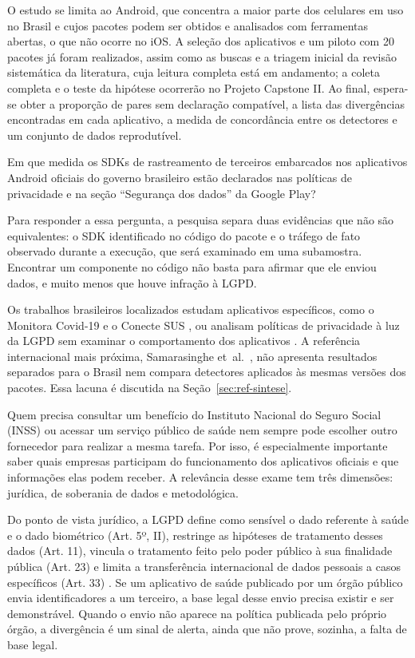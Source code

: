O estudo se limita ao Android, que concentra a maior parte dos celulares em uso no Brasil e cujos pacotes podem ser obtidos e analisados com ferramentas abertas, o que não ocorre no iOS. A seleção dos aplicativos e um piloto com 20 pacotes já foram realizados, assim como as buscas e a triagem inicial da revisão sistemática da literatura, cuja leitura completa está em andamento; a coleta completa e o teste da hipótese ocorrerão no Projeto Capstone II. Ao final, espera-se obter a proporção de pares sem declaração compatível, a lista das divergências encontradas em cada aplicativo, a medida de concordância entre os detectores e um conjunto de dados reprodutível.

\label{sec:problema}

Em que medida os SDKs de rastreamento de terceiros embarcados nos aplicativos Android oficiais do governo brasileiro estão declarados nas políticas de privacidade e na seção ``Segurança dos dados'' da Google Play?

Para responder a essa pergunta, a pesquisa separa duas evidências que não são equivalentes: o SDK identificado no código do pacote e o tráfego de fato observado durante a execução, que será examinado em uma subamostra. Encontrar um componente no código não basta para afirmar que ele enviou dados, e muito menos que houve infração à LGPD.

Os trabalhos brasileiros localizados estudam aplicativos específicos, como o Monitora Covid-19 \cite{lemos2022} e o Conecte SUS \cite{vaz2022}, ou analisam políticas de privacidade à luz da LGPD sem examinar o comportamento dos aplicativos \cite{reis2023}. A referência internacional mais próxima, Samarasinghe et~al.~\cite{samarasinghe2022}, não apresenta resultados separados para o Brasil nem compara detectores aplicados às mesmas versões dos pacotes. Essa lacuna é discutida na Seção~\ref{sec:ref-sintese}.

\label{sec:1.3}

Quem precisa consultar um benefício do Instituto Nacional do Seguro Social (INSS) ou acessar um serviço público de saúde nem sempre pode escolher outro fornecedor para realizar a mesma tarefa. Por isso, é especialmente importante saber quais empresas participam do funcionamento dos aplicativos oficiais e que informações elas podem receber. A relevância desse exame tem três dimensões: jurídica, de soberania de dados e metodológica.

Do ponto de vista jurídico, a LGPD define como sensível o dado referente à saúde e o dado biométrico (Art. 5º, II), restringe as hipóteses de tratamento desses dados (Art. 11), vincula o tratamento feito pelo poder público à sua finalidade pública (Art. 23) e limita a transferência internacional de dados pessoais a casos específicos (Art. 33) \cite{brasil2018}. Se um aplicativo de saúde publicado por um órgão público envia identificadores a um terceiro, a base legal desse envio precisa existir e ser demonstrável. Quando o envio não aparece na política publicada pelo próprio órgão, a divergência é um sinal de alerta, ainda que não prove, sozinha, a falta de base legal.

